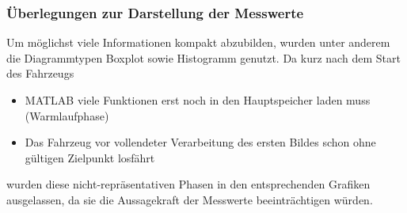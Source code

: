 \subsubsection{Überlegungen zur Darstellung der Messwerte}
Um möglichst viele Informationen kompakt abzubilden, wurden unter anderem die Diagrammtypen Boxplot sowie Histogramm genutzt. Da kurz nach dem Start des Fahrzeugs 
\begin{itemize}
\item
MATLAB viele Funktionen erst noch in den Hauptspeicher laden muss (\glqq Warmlaufphase\grqq)
\item
Das Fahrzeug vor vollendeter Verarbeitung des ersten Bildes schon ohne gültigen Zielpunkt losfährt
\end{itemize}
wurden diese nicht-repräsentativen Phasen in den entsprechenden Grafiken ausgelassen, da sie die Aussagekraft der Messwerte beeinträchtigen würden.






